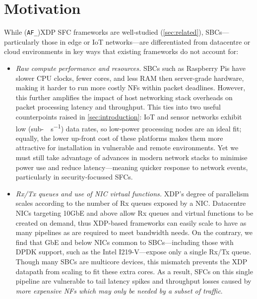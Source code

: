 \documentclass[comsoc, conference, times]{IEEEtran}
\newcommand{\af}{(\texttt{AF\_})XDP}
\begin{document}
\section{Motivation}\label{sec:motivation}
While \af{} SFC frameworks are well-studied (\cref{sec:related}), SBCs---particularly those in edge or IoT networks---are differentiated from datacentre or cloud environments in key ways that existing frameworks do not account for:
\begin{itemize}
	\item \emph{Raw compute performance and resources.}
	SBCs such as Raspberry Pis have slower CPU clocks, fewer cores, and less RAM then server-grade hardware, making it harder to run more costly NFs within packet deadlines.
	However, this further amplifies the impact of host networking stack overheads on packet processing latency and throughput.
	This ties into two useful counterpoints raised in \cref{sec:introduction}: IoT and sensor networks exhibit low (sub-\unit{\mega\bit\per\second}) data rates, so low-power processing nodes are an ideal fit; equally, the lower up-front cost of these platforms makes them more attractive for installation in vulnerable and remote environments.
	Yet we must still take advantage of advances in modern network stacks to minimise power use and reduce latency---meaning quicker response to network events, particularly in security-focussed SFCs.
	
	\item \emph{Rx/Tx queues and use of NIC virtual functions.}
	XDP's degree of parallelism scales according to the number of Rx queues exposed by a NIC.
	Datacentre NICs targeting 10GbE and above allow Rx queues and virtual functions to be created on demand, thus XDP-based frameworks can easily scale to have as many pipelines as are required to meet bandwidth needs.
	On the contrary, we find that GbE and below NICs common to SBCs---including those with DPDK support, such as the Intel I219-V---expose only a single Rx/Tx queue.
	Though many SBCs are multicore devices, this mismatch prevents the XDP datapath from scaling to fit these extra cores.
	As a result, SFCs on this single pipeline are vulnerable to tail latency spikes and throughput losses caused by \emph{more expensive NFs which may only be needed by a subset of traffic}.
\end{itemize}
\end{document}
